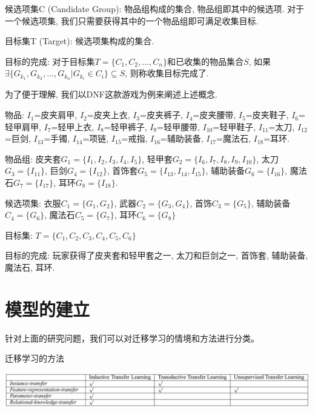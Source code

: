 \documentclass[10pt,journal,compsoc]{IEEEtran}
\begin{document}
候选项集C (Candidate Group): 物品组构成的集合, 物品组即其中的候选项. 对于一个候选项集, 我们只需要获得其中的一个物品组即可满足收集目标. 

目标集T (Target): 候选项集构成的集合.

目标的完成: 
对于目标集$T = \{C_1, C_2, \dots, C_n\}$和已收集的物品集合$S$, 如果$\exists \{G_{k_1}, G_{k_2}, \dots, G_{k_n} | G_{k_i} \in C_i\} \subseteq S$, 则称收集目标完成了.


为了便于理解, 我们以DNF这款游戏为例来阐述上述概念.

物品: $I_1$=皮夹肩甲, $I_2$=皮夹上衣, $I_3$=皮夹裤子, $I_4$=皮夹腰带, $I_5$=皮夹鞋子, $I_6$=轻甲肩甲, $I_7$=轻甲上衣, $I_8$=轻甲裤子, $I_9$=轻甲腰带, $I_{10}$=轻甲鞋子, $I_{11}$=太刀, $I_{12}$=巨剑, $I_{13}$=手镯, $I_{14}$=项链, $I_{15}$=戒指, $I_{16}$=辅助装备, $I_{17}$=魔法石, $I_{18}$=耳环. 

物品组: 皮夹套$G_1=\{I_1, I_2, I_3, I_4, I_5\}$, 轻甲套$G_2=\{I_6, I_7, I_8, I_9, I_{10}\}$, 太刀$G_3=\{I_{11}\}$, 巨剑$G_4=\{I_{12}\}$, 首饰套$G_5=\{I_{13}, I_{14}, I_{15}\}$, 辅助装备$G_6=\{I_{16}\}$, 魔法石$G_7=\{I_{17}\}$, 耳环$G_8=\{I_{18}\}$.

候选项集: 衣服$C_1=\{G_1, G_2\}$, 武器$C_2=\{G_3, G_4\}$, 首饰$C_3=\{G_5\}$, 辅助装备$C_4=\{G_6\}$, 魔法石$C_5=\{G_7\}$, 耳环$C_6=\{G_8\}$

目标集: $T=\{C_1, C_2, C_3, C_4, C_5, C_6\}$

目标的完成: 玩家获得了皮夹套和轻甲套之一, 太刀和巨剑之一, 首饰套, 辅助装备, 魔法石, 耳环. 


\section{模型的建立}

针对上面的研究问题，我们可以对迁移学习的情境和方法进行分类。

\begin{table}[!ht]
\centering
\caption{迁移学习的方法}
\label{tab:survey_method}
\includegraphics[width=40pc]{img/survey_tab3.jpg}
\end{table}
\end{document}
